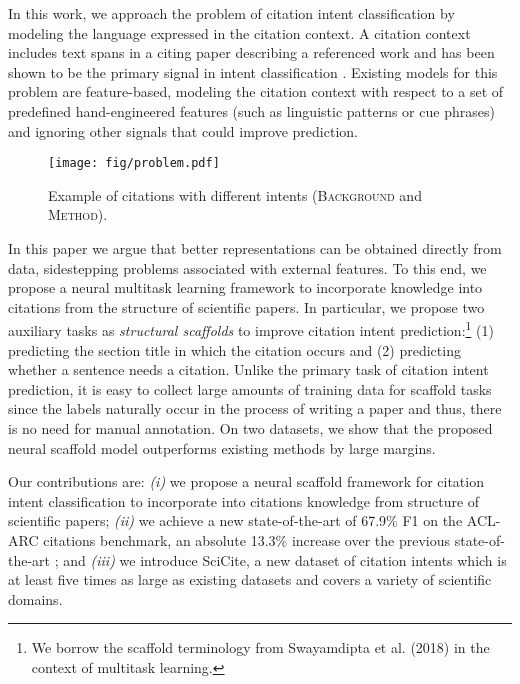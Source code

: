 \documentclass[11pt,a4paper]{article}
\newcommand{\ourdata}{SciCite\xspace}
\newcommand{\I}[1][\textit]{#1}
\newcommand{\background}{\textsc{Background}\xspace}
\newcommand{\method}{\textsc{Method}\xspace}
\begin{document}
In this work, we approach the problem of citation intent classification by modeling the language expressed in the citation context.
A citation context includes text spans in a citing paper describing a referenced work and has been shown to be the primary signal in intent classification \cite{teufel2006function,abu2013purpose,jurgens2018}. Existing models for this problem are feature-based, modeling the citation context with respect to a set of predefined hand-engineered features (such as linguistic patterns or cue phrases) and ignoring other signals that could improve prediction.





\begin{figure}[t]
\centering
\texttt{[image: fig/problem.pdf]}
\caption{
\small{Example of citations with different intents (\background and \method).}
}
\label{fig:problem-definition}
\end{figure}

In this paper we argue that better representations can be obtained directly from data, sidestepping problems associated with external features. To this end, we propose a neural multitask learning framework to incorporate knowledge into citations from the structure of scientific papers. In particular, we propose two auxiliary tasks as \I{structural scaffolds} to improve citation intent prediction:\footnote{We borrow the scaffold terminology from Swayamdipta et al. (2018) in the context of multitask learning.} (1) predicting the section title in which the citation occurs and (2) predicting whether a sentence needs a citation.
Unlike the primary task of citation intent prediction, it is easy to collect large amounts of training data for scaffold tasks since the labels naturally occur in the process of writing a paper and thus, there is no need for manual annotation. On two datasets, we show that the proposed neural scaffold model outperforms existing methods by large margins.

Our contributions are: \textit{(i)} we propose a neural scaffold framework for citation intent classification to incorporate into citations knowledge from structure of scientific papers; \textit{(ii)} we achieve a new state-of-the-art of 67.9\% F1 on the ACL-ARC citations benchmark, an absolute 13.3\% increase over the previous state-of-the-art \cite{jurgens2018}; and \textit{(iii)} we introduce \ourdata, a new dataset of citation intents which is at least five times as large as existing datasets and covers a variety of scientific domains.
\end{document}
